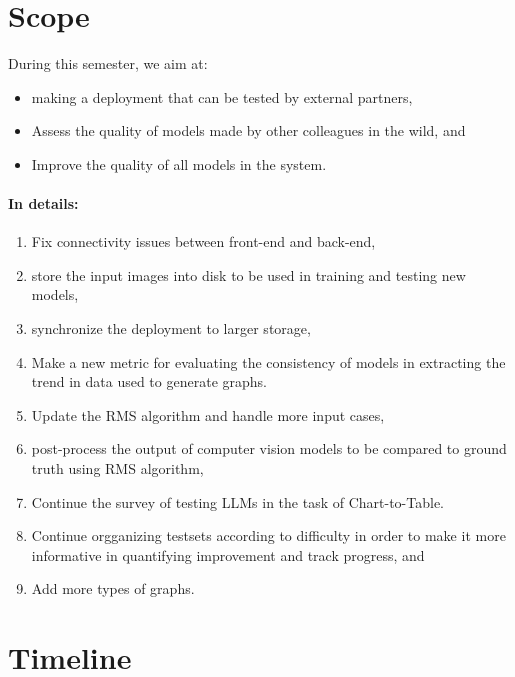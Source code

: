 \documentclass[
	letterpaper, %
]{jdf}
\begin{document}
\section{Scope}\label{sect:scope}

During this semester, we aim at:
\begin{itemize}
         \item  making a deployment that can be tested by external partners,
         \item Assess the quality of models made by other colleagues in the wild, and
         \item Improve the quality of all models in the system.
              \end{itemize}

\paragraph{In details:} 
\begin{enumerate}
    \item Fix connectivity issues between front-end and back-end,
    \item store the input images into disk to be used in training and testing new models,
    \item synchronize the deployment to larger storage,
         \item Make a new metric for evaluating the consistency of models in extracting the trend in data used to generate graphs.
         \item Update the RMS algorithm and handle more input cases,
         \item post-process the output of computer vision models to be compared to ground truth using RMS algorithm,
         \item Continue the survey of testing LLMs in the task of Chart-to-Table.
         \item Continue orgganizing testsets according to difficulty in order to make it more informative in quantifying improvement and track progress, and
         \item Add more types of graphs.
              \end{enumerate}

            
            \section{Timeline}\label{sect:timeline}
\end{document}
